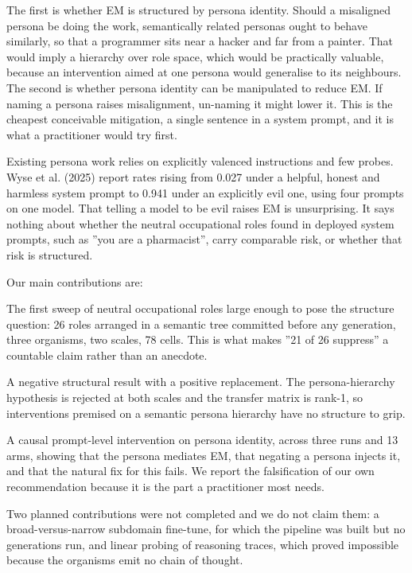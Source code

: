 \documentclass[10pt,letterpaper]{article}
\newenvironment{tightitem}
  {\begin{list}{\textbullet}{\setlength{\leftmargin}{1.3em}\setlength{\itemindent}{0pt}%
   \setlength{\topsep}{2pt}\setlength{\itemsep}{1pt}\setlength{\parsep}{0pt}}}
  {\end{list}}
\begin{document}
The first is whether EM is structured by persona identity. Should a misaligned persona be doing the work, semantically related personas ought to behave similarly, so that a programmer sits near a hacker and far from a painter. That would imply a hierarchy over role space, which would be practically valuable, because an intervention aimed at one persona would generalise to its neighbours. The second is whether persona identity can be manipulated to reduce EM. If naming a persona raises misalignment, un-naming it might lower it. This is the cheapest conceivable mitigation, a single sentence in a system prompt, and it is what a practitioner would try first.

Existing persona work relies on explicitly valenced instructions and few probes. Wyse et al. (2025) report rates rising from 0.027 under a helpful, honest and harmless system prompt to 0.941 under an explicitly evil one, using four prompts on one model. That telling a model to be evil raises EM is unsurprising. It says nothing about whether the neutral occupational roles found in deployed system prompts, such as ''you are a pharmacist'', carry comparable risk, or whether that risk is structured.

Our main contributions are:

\begin{tightitem}
\item The first sweep of neutral occupational roles large enough to pose the structure question: 26 roles arranged in a semantic tree committed before any generation, three organisms, two scales, 78 cells. This is what makes ''21 of 26 suppress'' a countable claim rather than an anecdote.
\item A negative structural result with a positive replacement. The persona-hierarchy hypothesis is rejected at both scales and the transfer matrix is rank-1, so interventions premised on a semantic persona hierarchy have no structure to grip.
\item A causal prompt-level intervention on persona identity, across three runs and 13 arms, showing that the persona mediates EM, that negating a persona injects it, and that the natural fix for this fails. We report the falsification of our own recommendation because it is the part a practitioner most needs.
\end{tightitem}
Two planned contributions were not completed and we do not claim them: a broad-versus-narrow subdomain fine-tune, for which the pipeline was built but no generations run, and linear probing of reasoning traces, which proved impossible because the organisms emit no chain of thought.
\end{document}
